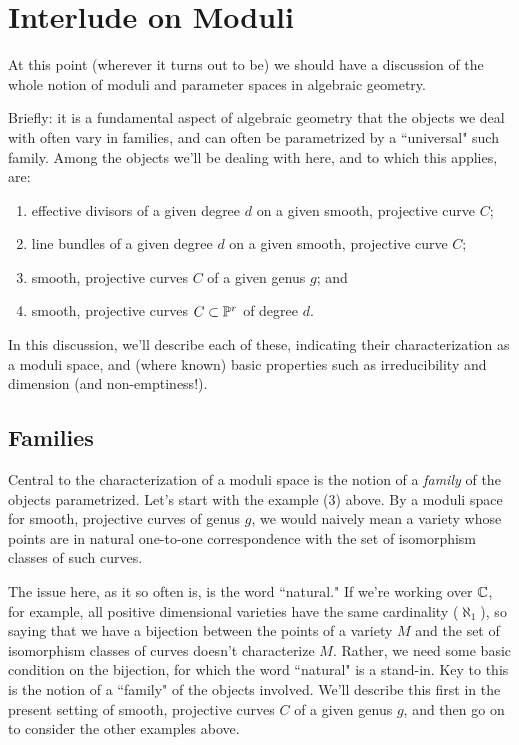 

\chapter{Interlude on Moduli}
\label{Moduli chapter}

At this point (wherever it turns out to be) we should have a discussion of the whole notion of moduli and parameter spaces in algebraic geometry.

Briefly: it is a fundamental aspect of algebraic geometry that the objects we deal with often vary in families, and can often be parametrized by a ``universal" such family. Among the objects we'll be dealing with here, and to which this applies, are:

\begin{enumerate}
\item effective divisors of a given degree $d$ on a given smooth, projective curve $C$;

\item line bundles of a given degree $d$ on a given smooth, projective curve $C$;

\item smooth, projective curves $C$ of a given genus $g$; and

\item smooth, projective curves $C \subset \PP^r$ of degree $d$.
\end{enumerate}

In this discussion, we'll describe each of these, indicating their characterization as a moduli space, and (where known) basic properties such as irreducibility and dimension (and non-emptiness!).

\section{Families}

Central to the characterization of a moduli space is the notion of a \emph{family} of the objects parametrized. Let's start with the example (3) above. By a moduli space for smooth, projective curves of genus $g$, we would naively mean a variety whose points are in natural one-to-one correspondence with the set of isomorphism classes of such curves.

The issue here, as it so often is,  is the word ``natural." If we're working over $\CC$, for example, all positive dimensional varieties have the same cardinality ($\aleph_1$), so saying that we have a bijection between the points of a variety $M$ and the set of isomorphism classes of curves doesn't characterize $M$. Rather, we need some basic condition on the bijection, for which the word ``natural" is a stand-in. Key to this is the notion of a ``family" of the objects involved. We'll describe this first in the present setting of smooth, projective curves $C$ of a given genus $g$, and then go on to consider the other examples above. 

